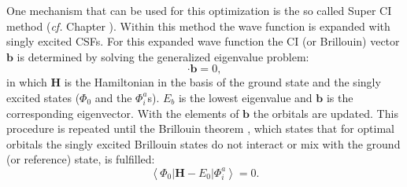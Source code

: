 One mechanism that can be used for this optimization is the so called Super CI \cite{superci1,superci2} method (\textit{cf.} Chapter \chorbopt). Within this method the wave function is expanded with singly excited CSFs. For this expanded wave function the CI (or Brillouin) vector $\mathbf{b}$ is determined by solving the generalized eigenvalue problem:
\begin{equation}
[\mathbf{H}-E_b] \cdot \mathbf{b} = 0,
\label{ch1.eq.geig}
\end{equation}
in which $\mathbf{H}$ is the Hamiltonian in the basis of the ground state and the singly excited states ($\Phi_0$ and the $\Phi_{i}^{a}$s). $E_b$ is the lowest eigenvalue and $\mathbf{b}$ is the corresponding eigenvector. With the elements of $\mathbf{b}$ the orbitals are updated. This procedure is repeated until the Brillouin theorem \cite{brillouin}, which states that for optimal orbitals the singly excited Brillouin states do not interact or mix with the ground (or reference) state, is fulfilled:
\begin{equation}
\left < \Phi_0 | \mathbf{H} - E_0 | \Phi_{i}^{a} \right > = 0.
\label{ch1.eq.brillouin}
\end{equation}

